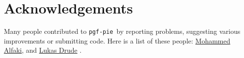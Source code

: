 \documentclass{ltxdoc}
\newcommand\pgfpiename{\texttt{pgf-pie}}
\begin{document}

\section{Acknowledgements}
Many people contributed to \pgfpiename\ by reporting problems,
suggesting various improvements or submitting code. Here is a list of
these people:
\href{mailto:mohammed.alfaki@ii.uib.no}{Mohammed Alfaki},
and
\href{mailto:ldrude@mail.uni-paderborn.de}{Lukas Drude}
.
                                              
\end{document}
